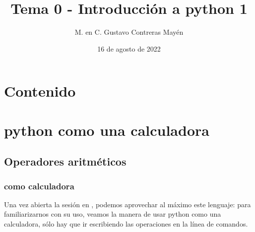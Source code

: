 \documentclass[12pt]{beamer}
\title{Tema 0 - Introducción a python 1}
\author{M. en C. Gustavo Contreras Mayén}
\date{16 de agosto de 2022}
\begin{document}
\maketitle

\section*{Contenido}
\fontsize{14}{14}\selectfont
{}


\section{python como una calculadora}
\subsection{Operadores aritméticos}

\begin{frame}
\frametitle{\python{} como calculadora}
Una vez abierta la sesión en \python, podemos aprovechar al máximo este lenguaje: \pause para familiarizarnos con su uso, veamos la manera de usar python como una calculadora, sólo hay que ir escribiendo las operaciones en la línea de comandos.
\end{frame}
\end{document}
